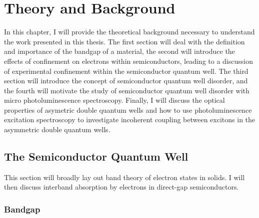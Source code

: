 \chapter{Theory and Background}
In this chapter, I will provide the theoretical background necessary to understand the work presented in this thesis. The first section will deal with the definition and importance of the bandgap of a material, the second will introduce the effects of confinement on electrons within semiconductors, leading to a discussion of experimental confinement within the semiconductor quantum well. The third section will introduce the concept of semiconductor quantum well disorder, and the fourth will motivate the study of semiconductor quantum well disorder with micro photoluminescence spectroscopy. Finally, I will discuss the optical properties of asymetric double quantum wells and how to use photoluminescence excitation spectroscopy to investigate incoherent coupling between excitons in the asymmetric double quantum wells.

\section{The Semiconductor Quantum Well}
This section will broadly lay out band theory of electron states in solids. I will then discuss interband absorption by electrons in direct-gap semiconductors. 
\subsection{Bandgap}


